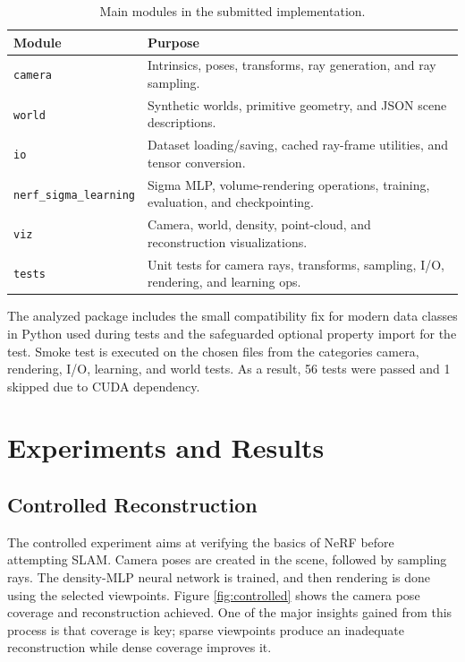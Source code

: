 \documentclass[conference]{IEEEtran}
\begin{document}
\begin{table}[t]
\centering
\caption{Main modules in the submitted implementation.}
\label{tab:modules}
\begin{tabularx}{\columnwidth}{p{}X}
\toprule
\textbf{Module} & \textbf{Purpose}\\
\midrule
\texttt{camera} & Intrinsics, poses, transforms, ray generation, and ray sampling.\\
\texttt{world} & Synthetic worlds, primitive geometry, and JSON scene descriptions.\\
\texttt{io} & Dataset loading/saving, cached ray-frame utilities, and tensor conversion.\\
\texttt{nerf\_sigma\_\newline learning} & Sigma MLP, volume-rendering operations, training, evaluation, and checkpointing.\\
\texttt{viz} & Camera, world, density, point-cloud, and reconstruction visualizations.\\
\texttt{tests} & Unit tests for camera rays, transforms, sampling, I/O, rendering, and learning ops.\\
\bottomrule
\end{tabularx}
\end{table}

The analyzed package includes the small compatibility fix for modern data classes in Python used during tests and the safeguarded optional property import for the test. Smoke test is executed on the chosen files from the categories camera, rendering, I/O, learning, and world tests. As a result, 56 tests were passed and 1 skipped due to CUDA dependency. 

\section{Experiments and Results}
\subsection{Controlled Reconstruction}
The controlled experiment aims at verifying the basics of NeRF before attempting SLAM. Camera poses are created in the scene, followed by sampling rays. The density-MLP neural network is trained, and then rendering is done using the selected viewpoints. Figure \ref{fig:controlled} shows the camera pose coverage and reconstruction achieved. One of the major insights gained from this process is that coverage is key; sparse viewpoints produce an inadequate reconstruction while dense coverage improves it.
\end{document}
